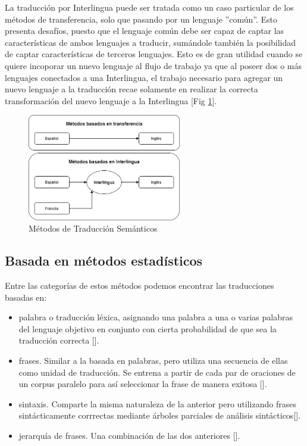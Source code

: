 La traducción por Interlingua puede ser tratada como un caso particular de los métodos de transferencia, solo que pasando por un lenguaje ''común''. Esto presenta desafíos, puesto que el
lenguaje común debe ser capaz de captar las características de ambos lenguajes a traducir, sumándole también la posibilidad de captar características de terceros lenguajes. Esto es de gran utilidad cuando se quiere incoporar un nuevo lenguaje al flujo de trabajo ya que al poseer dos o más lenguajes conectados a una Interlingua, el trabajo necesario para agregar un nuevo lenguaje a la traducción recae solamente en realizar la correcta transformación del nuevo lenguaje a la Interlingua [Fig \ref{fig:traduccion}].

\begin{figure}[ht!]
    \centering
    \includegraphics[width=0.6\textwidth]{Graphics/traduccion.png}
    \caption{Métodos de Traducción Semánticos}
    \label{fig:traduccion}
\end{figure}

\subsection{Basada en métodos estadísticos}\label{subsection:state-of-the-art:traduccion:stats}
Entre las categorías de estos métodos podemos encontrar las traducciones basadas en:
\begin{itemize}
\item palabra o traducción léxica, asignando una palabra a una o varias palabras del lenguaje objetivo en conjunto con cierta probabilidad de que sea la traducción correcta [\cite{koehn2009statistical}].
\item frases. Similar a la basada en palabras, pero utiliza una secuencia
de ellas como unidad de traducción. Se entrena a partir de cada par de oraciones de un corpus paralelo para así seleccionar la frase de manera exitosa [\cite{koehn2003statistical}].
\item sintaxis. Comparte la misma naturaleza de la anterior pero utilizando frases sintácticamente corrrectas mediante árboles parciales de análisis sintácticos[\cite{williams2016syntax}].
\item jerarquía de frases. Una combinación de las dos anteriores [\cite{chiang2005hierarchical}].
\end{itemize}

